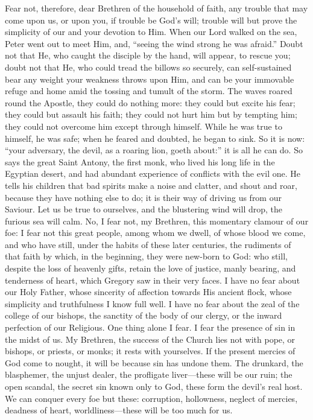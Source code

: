 Fear not, therefore, dear Brethren of the household of
faith, any trouble that may come upon us, or upon you, if
trouble be God's will; trouble will but prove the
simplicity of our and your devotion to Him. When our Lord
walked on the sea, Peter went out to meet Him, and,
``seeing the wind strong he was afraid.'' Doubt
not that He, who caught the disciple by the hand, will
appear, to rescue you; doubt not that He, who could tread
the billows so securely, can self-sustained bear any
weight your weakness throws upon Him, and can be your
immovable refuge and home amid the tossing and tumult of
the storm. The waves roared round the Apostle, they could
do nothing more: they could but excite his fear; they
could but assault his faith; they could not hurt him but
by tempting him; they could not overcome him except
through himself. While he was true to himself, he was
safe; when he feared and doubted, he began to sink. So it
is now: ``your adversary, the devil, as a roaring
lion, goeth about:'' it is all he can do. So says the
great Saint Antony, the first monk, who lived his long
life in the Egyptian desert, and had abundant experience
of conflicts with the evil one. He tells his children
that bad spirits make a noise and clatter, and shout and
roar, because they have nothing else to do; it is their
way of driving us from our Saviour. Let us be true to
ourselves, and the blustering wind will drop, the furious
sea will calm. No, I fear not, my Brethren, this
momentary clamour of our foe: I fear not this great
people, among whom we dwell, of whose blood we come, and
who have still, under the habits of these later
centuries, the rudiments of that faith by which, in the
beginning, they were new-born to God: who still, despite
the loss of heavenly gifts, retain the love of justice,
manly bearing, and tenderness of heart, which Gregory saw
in their very faces. I have no fear about our Holy
Father, whose sincerity of affection towards His ancient flock, whose simplicity and truthfulness I know full
well. I have no fear about the zeal of the college of our
bishops, the sanctity of the body of our clergy, or the
inward perfection of our Religious. One thing alone I
fear. I fear the presence of sin in the midst of us. My
Brethren, the success of the Church lies not with pope,
or bishops, or priests, or monks; it rests with
yourselves. If the present mercies of God come to nought,
it will be because sin has undone them. The drunkard, the
blasphemer, the unjust dealer, the profligate
liver—these will be our ruin; the open scandal, the
secret sin known only to God, these form the devil's real
host. We can conquer every foe but these: corruption,
hollowness, neglect of mercies, deadness of heart,
worldliness—these will be too much for us.


